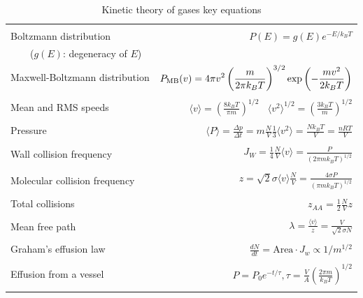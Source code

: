 \documentclass[11pt]{article}
\begin{document}
\begin{outline}
\begin{table} 
\begin{center}
    \caption{Kinetic theory of gases key equations}
    \begin{tabular}{|lr|}
     \hline
 & \\
Boltzmann distribution & $\displaystyle P(E) = g(E) e^{-E/k_BT}$ \\ \ \ \ \ ($g(E)$: degeneracy of
$E$) & \\ 
Maxwell-Boltzmann distribution & $ \displaystyle
P_{\rm MB}(v) = 4\pi v^2 \left( \frac{m}{2\pi k_B T}\right)^{3/2}\exp\left(-\frac{m
    v^2}{2k_B T}\right) $ \\  & \\
Mean and RMS speeds & 

$\displaystyle \langle v \rangle = \left( \frac{8 k_B T}{\pi m} \right)^{1/2} \ \ \ \ \langle v^2
\rangle^{1/2} = \left( \frac{3 k_B T}{m} \right)^{1/2} $ \\  & \\

Pressure & $
\displaystyle \langle P \rangle = \frac{\Delta p}{\Delta t} = m \frac{N}{V}\frac{1}{3}\langle v^2
\rangle = \frac{N k_B T}{V}=\frac{n R T}{V} $ \\ & \\ 

Wall collision frequency &
$ \displaystyle  J_W = \frac{1}{4}\frac{N}{V}\langle v \rangle=\frac{P}{\left( 2 \pi m k_B
    T\right)^{1/2}} $ \\ & \\

Molecular collision frequency &
$ \displaystyle  z=\sqrt{2} \sigma \langle v \rangle\frac{N}{V} = \frac{4\sigma P}{\left( \pi m k_B T
  \right)^{1/2}} $ \\ & \\

Total collisions &
$ \displaystyle z_{AA} = \frac{1}{2} \frac{N}{V} z$ \\ & \\

Mean free path &
$\displaystyle \lambda = \frac{ \langle v \rangle}{z} = \frac{V}{\sqrt{2} \sigma N} $
\\ & \\

Graham's effusion law & $\displaystyle \frac{dN}{dt}=\text{Area}\cdot  J_w \propto 1/m^{1/2} $
\\ & \\
Effusion from a vessel & $\displaystyle P=P_0 e^{-t/\tau}, \tau = \frac{V}{A}\left
  (\frac{2\pi m}{k_B T}\right )^{1/2} $ \\ & \\ 


\end{tabular}
\end{center}
\end{table}
\end{outline}
\end{document}
